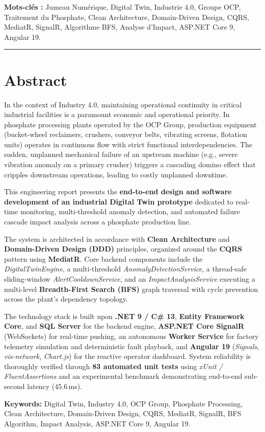 \textbf{Mots-clés :} Jumeau Numérique, Digital Twin, Industrie 4.0, Groupe OCP, Traitement du Phosphate, Clean Architecture, Domain-Driven Design, CQRS, MediatR, SignalR, Algorithme BFS, Analyse d'Impact, ASP.NET Core 9, Angular 19.

\vspace{0.8cm}
\hrule
\vspace{0.8cm}

\section*{Abstract}

In the context of Industry 4.0, maintaining operational continuity in critical industrial facilities is a paramount economic and operational priority. In phosphate processing plants operated by the OCP Group, production equipment (bucket-wheel reclaimers, crushers, conveyor belts, vibrating screens, flotation units) operates in continuous flow with strict functional interdependencies. The sudden, unplanned mechanical failure of an upstream machine (e.g., severe vibration anomaly on a primary crusher) triggers a cascading domino effect that cripples downstream operations, leading to costly unplanned downtime.

This engineering report presents the \textbf{end-to-end design and software development of an industrial Digital Twin prototype} dedicated to real-time monitoring, multi-threshold anomaly detection, and automated failure cascade impact analysis across a phosphate production line.

The system is architected in accordance with \textbf{Clean Architecture} and \textbf{Domain-Driven Design (DDD)} principles, organized around the \textbf{CQRS} pattern using \textbf{MediatR}. Core backend components include the \textit{DigitalTwinEngine}, a multi-threshold \textit{AnomalyDetectionService}, a thread-safe sliding-window \textit{AlertCooldownService}, and an \textit{ImpactAnalysisService} executing a multi-level \textbf{Breadth-First Search (BFS)} graph traversal with cycle prevention across the plant's dependency topology.

The technology stack is built upon \textbf{.NET 9 / C\# 13}, \textbf{Entity Framework Core}, and \textbf{SQL Server} for the backend engine, \textbf{ASP.NET Core SignalR} (WebSockets) for real-time pushing, an autonomous \textbf{Worker Service} for factory telemetry simulation and deterministic fault playback, and \textbf{Angular 19} (\textit{Signals}, \textit{vis-network}, \textit{Chart.js}) for the reactive operator dashboard. System reliability is thoroughly verified through \textbf{83 automated unit tests} using \textit{xUnit / FluentAssertions} and an experimental benchmark demonstrating end-to-end sub-second latency ($45.6$\,ms).

\textbf{Keywords:} Digital Twin, Industry 4.0, OCP Group, Phosphate Processing, Clean Architecture, Domain-Driven Design, CQRS, MediatR, SignalR, BFS Algorithm, Impact Analysis, ASP.NET Core 9, Angular 19.